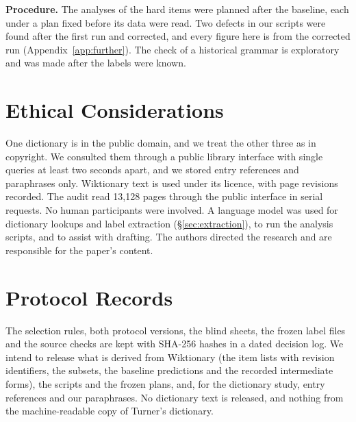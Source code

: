 \documentclass[11pt]{article}
\begin{document}
\textbf{Procedure.} The analyses of the hard items were planned after the baseline, each under a plan fixed before its data were read. Two defects in our scripts were found after the first run and corrected, and every figure here is from the corrected run (Appendix~\ref{app:further}). The check of a historical grammar is exploratory and was made after the labels were known.

\section*{Ethical Considerations}

One dictionary is in the public domain, and we treat the other three as in copyright. We consulted them through a public library interface with single queries at least two seconds apart, and we stored entry references and paraphrases only. Wiktionary text is used under its licence, with page revisions recorded. The audit read 13,128 pages through the public interface in serial requests. No human participants were involved. A language model was used for dictionary lookups and label extraction (\S\ref{sec:extraction}), to run the analysis scripts, and to assist with drafting. The authors directed the research and are responsible for the paper's content.



\appendix

\section{Protocol Records}
\label{app:records}

The selection rules, both protocol versions, the blind sheets, the frozen label files and the source checks are kept with SHA-256 hashes in a dated decision log. We intend to release what is derived from Wiktionary (the item lists with revision identifiers, the subsets, the baseline predictions and the recorded intermediate forms), the scripts and the frozen plans, and, for the dictionary study, entry references and our paraphrases. No dictionary text is released, and nothing from the machine-readable copy of Turner's dictionary.
\end{document}
